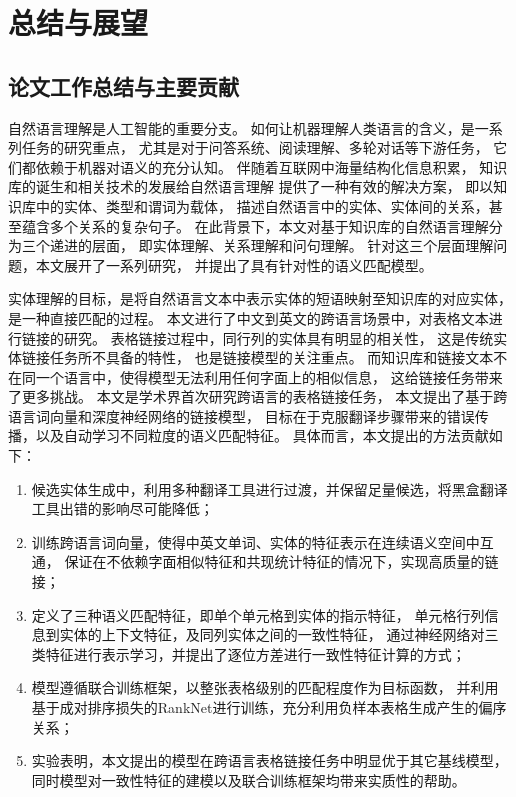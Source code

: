 
\chapter{总结与展望}
\label{chap:conclusion}

\section{论文工作总结与主要贡献}

自然语言理解是人工智能的重要分支。
如何让机器理解人类语言的含义，是一系列任务的研究重点，
尤其是对于问答系统、阅读理解、多轮对话等下游任务，
它们都依赖于机器对语义的充分认知。
伴随着互联网中海量结构化信息积累，
知识库的诞生和相关技术的发展给自然语言理解
提供了一种有效的解决方案，
即以知识库中的实体、类型和谓词为载体，
描述自然语言中的实体、实体间的关系，甚至蕴含多个关系的复杂句子。
在此背景下，本文对基于知识库的自然语言理解分为三个递进的层面，
即实体理解、关系理解和问句理解。
针对这三个层面理解问题，本文展开了一系列研究，
并提出了具有针对性的语义匹配模型。


实体理解的目标，是将自然语言文本中表示实体的短语映射至知识库的对应实体，
是一种直接匹配的过程。
本文进行了中文到英文的跨语言场景中，对表格文本进行链接的研究。
表格链接过程中，同行列的实体具有明显的相关性，
这是传统实体链接任务所不具备的特性，
也是链接模型的关注重点。
而知识库和链接文本不在同一个语言中，使得模型无法利用任何字面上的相似信息，
这给链接任务带来了更多挑战。
本文是学术界首次研究跨语言的表格链接任务，
本文提出了基于跨语言词向量和深度神经网络的链接模型，
目标在于克服翻译步骤带来的错误传播，以及自动学习不同粒度的语义匹配特征。
具体而言，本文提出的方法贡献如下：
\begin{enumerate}
\item{候选实体生成中，利用多种翻译工具进行过渡，并保留足量候选，将黑盒翻译工具出错的影响尽可能降低；}
\item{训练跨语言词向量，使得中英文单词、实体的特征表示在连续语义空间中互通，
保证在不依赖字面相似特征和共现统计特征的情况下，实现高质量的链接；}
\item{定义了三种语义匹配特征，即单个单元格到实体的指示特征，
单元格行列信息到实体的上下文特征，及同列实体之间的一致性特征，
通过神经网络对三类特征进行表示学习，并提出了逐位方差进行一致性特征计算的方式；}
\item{模型遵循联合训练框架，以整张表格级别的匹配程度作为目标函数，
并利用基于成对排序损失的RankNet进行训练，充分利用负样本表格生成产生的偏序关系；}
\item{实验表明，本文提出的模型在跨语言表格链接任务中明显优于其它基线模型，
同时模型对一致性特征的建模以及联合训练框架均带来实质性的帮助。}
\end{enumerate}


